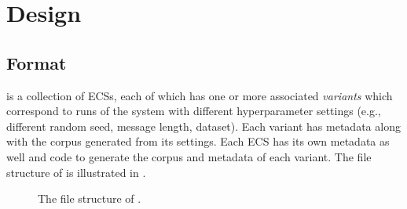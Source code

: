\section{Design}
\unskip\label{elcc:sec:design}

\subsection{Format}
\unskip\label{elcc:sec:format}

\theLib{} is a collection of ECSs, each of which has one or more associated \emph{variants} which correspond to runs of the system with different hyperparameter settings (e.g., different random seed, message length, dataset).
Each variant has metadata along with the corpus generated from its settings.
Each ECS has its own metadata as well and code to generate the corpus and metadata of each variant.
The file structure of \theLib{} is illustrated in .

\begin{figure}
  \centering
  \fontsize{8pt}{8pt}\selectfont
  \caption{The file structure of \theLib{}.}
  \unskip\label{elcc:fig:structure}
\end{figure}


